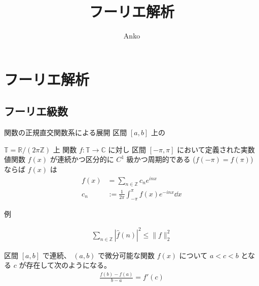 \documentclass[uplatex,dvipdfmx,a4paper,11pt]{jlreq}
\title{フーリエ解析}
\author{Anko}
\newcommand{\CC}{\mathbb{C}}
\newcommand{\RR}{\mathbb{R}}
\newcommand{\ZZ}{\mathbb{Z}}
\newcommand{\TT}{\mathbb{T}}
\theoremstyle{definition}
\begin{document}
\maketitle
\tableofcontents
\clearpage

\section{フーリエ解析}
\subsection{フーリエ級数}
\begin{definition}[内積]
  関数の正規直交関数系による展開
  区間 $[a, b]$ 上の
\end{definition}


\begin{definition}[複素フーリエ級数]
  $\TT = \RR/(2\pi\ZZ)$ 上 関数 $f: \TT\to\CC$ に対し
  区間 $[-\pi, \pi]$ において定義された実数値関数 $f(x)$ が連続かつ区分的に $C^1$ 級かつ周期的である ($f(-\pi) = f(\pi)$) ならば $f(x)$ は
  \begin{align}
    f(x) & = \sum_{n\in\ZZ}c_ne^{inx}                          \\
    c_n  & := \frac{1}{2\pi}\int_{-\pi}^\pi f(x)e^{-inx}\dd{x}
  \end{align}
\end{definition}
例
\begin{theorem}
  \begin{align}
    \sum_{n\in\ZZ}|\hat{f}(n)|^2 \leq \|f\|_2^2
  \end{align}
\end{theorem}


\begin{theorem}[平均値の定理]
  区間 $[a, b]$ で連続、 $(a, b)$ で微分可能な関数 $f(x)$ について $a < c < b$ となる $c$ が存在して次のようになる。
  \begin{align}
    \frac{f(b) - f(a)}{b - a} = f'(c)
  \end{align}
\end{theorem}
\end{document}
